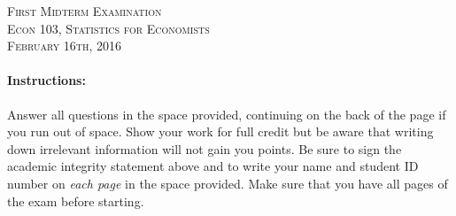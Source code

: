 \documentclass[addpoints,12pt]{exam}
\begin{document}
\begin{center}
\textsc{\large First Midterm Examination\\ \normalsize Econ 103, Statistics for Economists \\ \vspace{0.5em} February 16th, 2016}

\vspace{2em}



\end{center}


\vspace{2em}
\begin{center}
\end{center}
\vspace{0.2in}

\vspace{0.2in}

\noindent{}

\vspace{0.2in}

\noindent{}
\hfill
{}

\vspace{2em}

\begin{center}
  \gradetable[h][questions]
\end{center}

\vspace{2em}

\paragraph{Instructions:} Answer all questions in the space provided, continuing on the back of the page if you run out of space. Show your work for full credit but be aware that writing down irrelevant information will not gain you points. Be sure to sign the academic integrity statement above and to write your name and student ID number on \emph{each page} in the space provided. Make sure that you have all pages of the exam before starting.
\end{document}
